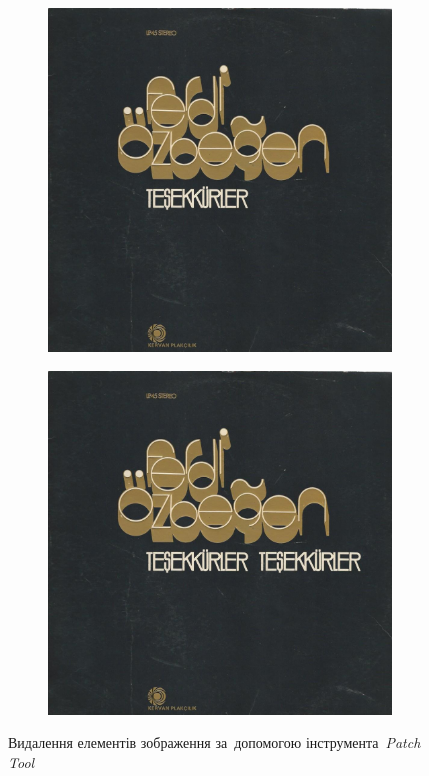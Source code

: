 \documentclass[
	a4paper,
	oneside,
	BCOR = 10mm,
	DIV = 12,
	12pt,
	headings = normal,
]{scrartcl}
\begin{document}
				\begin{figure}[!htbp]
					\centering
					\begin{subfigure}{0.5\textwidth}
						\centering
						\includegraphics[height = 6\baselineskip]{./../01-solution/src.jpeg}
						\caption{}
						\label{subfig:02-01-src}
					\end{subfigure}%
					\begin{subfigure}{0.5\textwidth}
						\centering
						\includegraphics[height = 6\baselineskip]{./../01-solution/y03s01-multimedia-lab-02-01-p02-patch-tool.jpg}
						\caption{}
						\label{subfig:02-02-res}
					\end{subfigure}
					\caption{Видалення елементів зображення за~допомогою інструмента~\emph{\textenglish{Patch Tool}}}
					\label{fig:02-removal-patch-tool}
				\end{figure}
\end{document}
